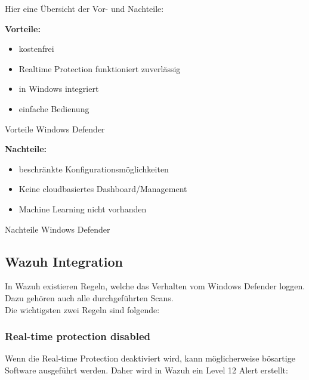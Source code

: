 \newpage

Hier eine Übersicht der Vor- und Nachteile:\\

\begin{minipage}{\linewidth}
    \begin{multicols}{2}
        \begin{table}[H]
            \begin{center}
                \textbf{Vorteile:}
                \begin{itemize}
                    \item kostenfrei
                    \item Realtime Protection funktioniert zuverlässig
                    \item in Windows integriert
                    \item einfache Bedienung
                \end{itemize}
            \end{center}
            \caption{Vorteile Windows Defender}
        \end{table}
        \begin{table}[H]
            \begin{center}
                \textbf{Nachteile:}
                \begin{itemize}
                    \item beschränkte Konfigurationsmöglichkeiten
                    \item Keine cloudbasiertes Dashboard/Management
                    \item Machine Learning nicht vorhanden
                \end{itemize}
            \end{center}
            \caption{Nachteile Windows Defender}
        \end{table}
    \end{multicols}
\end{minipage}


\subsection{Wazuh Integration}
In Wazuh existieren Regeln, welche das Verhalten vom Windows Defender loggen.
Dazu gehören auch alle durchgeführten Scans.\\

Die wichtigsten zwei Regeln sind folgende:
\subsubsection{Real-time protection disabled}
Wenn die Real-time Protection deaktiviert wird, kann möglicherweise bösartige Software ausgeführt werden.
Daher wird in Wazuh ein Level 12 Alert erstellt: 

